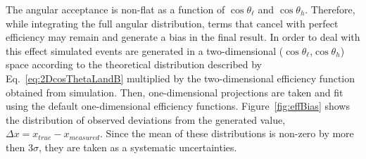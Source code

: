 The angular acceptance is non-flat as a function of $\cos\theta_\ell$ and $\cos \theta_h$.
Therefore, while integrating the full angular distribution, terms that cancel with perfect efficiency
may remain and generate a bias in the final result. In order to deal with this effect simulated events are
generated in a two-dimensional ($\cos\theta_\ell$,$\cos \theta_h$) space according to the
theoretical distribution described by Eq.~\ref{eq:2DcosThetaLandB} multiplied by the two-dimensional
efficiency function obtained from simulation. %
Then, one-dimensional projections are taken and fit using the default one-dimensional efficiency functions.
Figure~\ref{fig:effBias} shows the distribution of observed deviations from the generated 
value, $\Delta x = x_{true} - x_{measured}$.
Since the mean of these distributions is non-zero by more then 3$\sigma$, they are taken as a systematic uncertainties.
%
%
